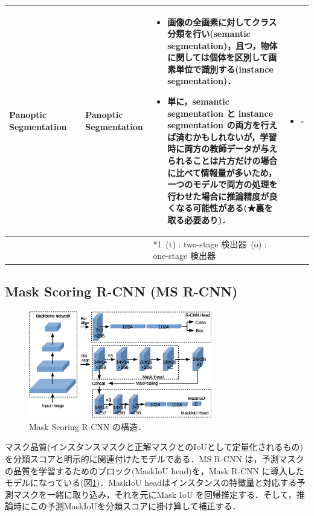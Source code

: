 \documentclass[twocolumn]{jsarticle} %
\begin{document}
\begin{table}
\begin{center}
\begin{tabularx}{\linewidth}{Xp{1.5cm}Xp{7cm}X}
            Panoptic Segmentation & \cite{KHGRD19} & Panoptic Segmentation & 
            \begin{itemize}
                \vspace{-0.7\baselineskip}
                \setlength{\leftskip}{-3mm}
                \item 画像の全画素に対してクラス分類を行い(semantic segmentation)，且つ，物体に関しては個体を区別して画素単位で識別する(instance segmentation)．
                \item 単に，semantic segmentation と instance segmentation の両方を行えば済むかもしれないが，学習時に両方の教師データが与えられることは片方だけの場合に比べて情報量が多いため，一つのモデルで両方の処理を行わせた場合に推論精度が良くなる可能性がある(★裏を取る必要あり)．
            \end{itemize}
            &
            \begin{itemize}
                \vspace{-0.7\baselineskip}
                \setlength{\leftskip}{-3mm}
                \item -
            \end{itemize}
            \\
            \bottomrule
            &  &  & *1\ (t) : two-stage 検出器\quad *2\ (o) : one-stage 検出器 &  \\
        \end{tabularx}
    \end{center}
\end{table}%

\subsection{Mask Scoring R-CNN (MS R-CNN) \cite{HHGHW19}}
\begin{figure}[tb]
    \begin{center}
        \includegraphics[width=8cm,clip]{fig/archi_ms_rcnn.eps}
    \end{center}
    \caption{ Mask Scoring R-CNN の構造．}
    \label{fig:archi_ms_rcnn}
\end{figure}
マスク品質(インスタンスマスクと正解マスクとのIoUとして定量化されるもの)を分類スコアと明示的に関連付けたモデルである．MS R-CNN は，予測マスクの品質を学習するためのブロック(MaskIoU head)を，Mask R-CNN\cite{HGDG17} に導入したモデルになっている(図\ref{fig:archi_ms_rcnn})．MaskIoU headはインスタンスの特徴量と対応する予測マスクを一緒に取り込み，それを元にMask IoU を回帰推定する．そして，推論時にこの予測MaskIoUを分類スコアに掛け算して補正する．
\end{document}
